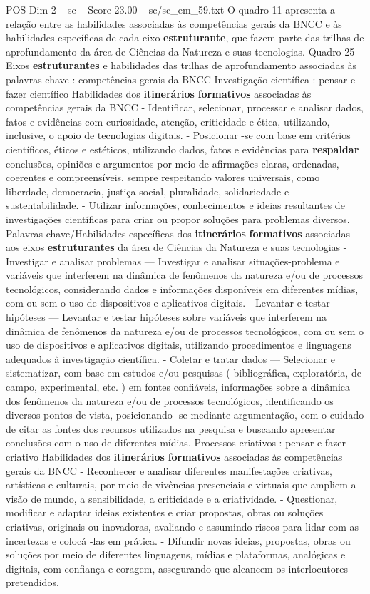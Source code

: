 \begin{textsample}{POS Dim 2 – sc – Score 23.00 – sc/sc\_em\_59.txt}
O quadro 11 apresenta a relação entre as habilidades associadas às competências gerais da BNCC e às habilidades específicas de cada eixo \textbf{estruturante}, que fazem parte das trilhas de aprofundamento da área de Ciências da Natureza e suas tecnologias.
Quadro 25 - Eixos \textbf{estruturantes} e habilidades das trilhas de aprofundamento associadas às palavras-chave : competências gerais da BNCC Investigação científica : pensar e fazer científico Habilidades dos \textbf{itinerários} \textbf{formativos} associadas às competências gerais da BNCC - Identificar, selecionar, processar e analisar dados, fatos e evidências com curiosidade, atenção, criticidade e ética, utilizando, inclusive, o apoio de tecnologias digitais. - Posicionar -se com base em critérios científicos, éticos e estéticos, utilizando dados, fatos e evidências para \textbf{respaldar} conclusões, opiniões e argumentos por meio de afirmações claras, ordenadas, coerentes e compreensíveis, sempre respeitando valores universais, como liberdade, democracia, justiça social, pluralidade, solidariedade e sustentabilidade. - Utilizar informações, conhecimentos e ideias resultantes de investigações científicas para criar ou propor soluções para problemas diversos.
Palavras-chave/Habilidades específicas dos \textbf{itinerários} \textbf{formativos} associadas aos eixos \textbf{estruturantes} da área de Ciências da Natureza e suas tecnologias - Investigar e analisar problemas — Investigar e analisar situações-problema e variáveis que interferem na dinâmica de fenômenos da natureza e/ou de processos tecnológicos, considerando dados e informações disponíveis em diferentes mídias, com ou sem o uso de dispositivos e aplicativos digitais. - Levantar e testar hipóteses — Levantar e testar hipóteses sobre variáveis que interferem na dinâmica de fenômenos da natureza e/ou de processos tecnológicos, com ou sem o uso de dispositivos e aplicativos digitais, utilizando procedimentos e linguagens adequados à investigação científica. - Coletar e tratar dados — Selecionar e sistematizar, com base em estudos e/ou pesquisas ( bibliográfica, exploratória, de campo, experimental, etc. ) em fontes confiáveis, informações sobre a dinâmica dos fenômenos da natureza e/ou de processos tecnológicos, identificando os diversos pontos de vista, posicionando -se mediante argumentação, com o cuidado de citar as fontes dos recursos utilizados na pesquisa e buscando apresentar conclusões com o uso de diferentes mídias.
Processos criativos : pensar e fazer criativo Habilidades dos \textbf{itinerários} \textbf{formativos} associadas às competências gerais da BNCC - Reconhecer e analisar diferentes manifestações criativas, artísticas e culturais, por meio de vivências presenciais e virtuais que ampliem a visão de mundo, a sensibilidade, a criticidade e a criatividade. - Questionar, modificar e adaptar ideias existentes e criar propostas, obras ou soluções criativas, originais ou inovadoras, avaliando e assumindo riscos para lidar com as incertezas e colocá -las em prática. - Difundir novas ideias, propostas, obras ou soluções por meio de diferentes linguagens, mídias e plataformas, analógicas e digitais, com confiança e coragem, assegurando que alcancem os interlocutores pretendidos.

\end{textsample}
